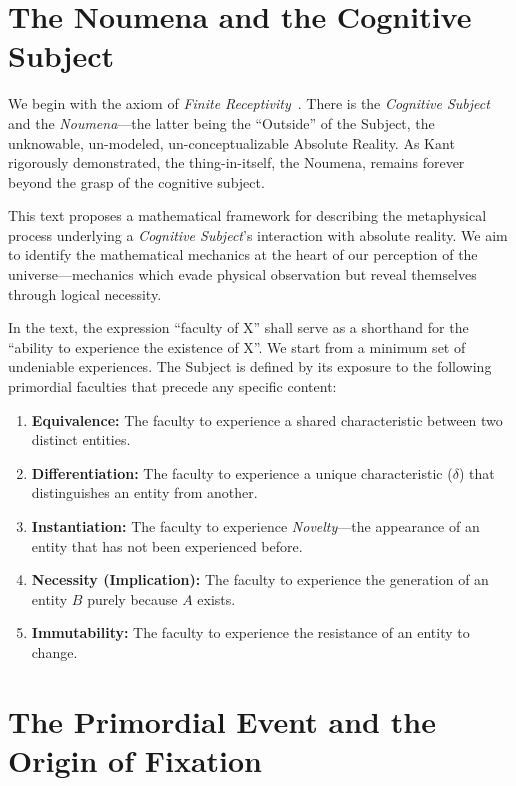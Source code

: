 \documentclass[11pt, a4paper]{article}
\theoremstyle{formalism}
\begin{document}
\section{The Noumena and the Cognitive Subject}

We begin with the axiom of \textit{Finite Receptivity}~\cite{Kant1781}. There
is the {\it Cognitive Subject\/} and the {\it Noumena\/}---the latter being the
``Outside'' of the Subject, the unknowable, un-modeled, un-conceptualizable
Absolute Reality. As Kant rigorously demonstrated, the thing-in-itself, the
Noumena, remains forever beyond the grasp of the cognitive subject.

This text proposes a mathematical framework for describing the metaphysical
process underlying a {\it Cognitive Subject\/}'s interaction with absolute
reality. We aim to identify the mathematical mechanics at the heart of our
perception of the universe---mechanics which evade physical observation but
reveal themselves through logical necessity.

In the text, the expression ``faculty of X'' shall serve as a shorthand for the
``ability to experience the existence of X''. We start from a minimum set of
undeniable experiences. The Subject is defined by its exposure to the following
primordial faculties that precede any specific content:

\begin{enumerate}
    \item \textbf{Equivalence:} The faculty to experience a shared 
    characteristic between two distinct entities. 

    \item \textbf{Differentiation:} The faculty to experience a unique 
    characteristic ($\delta$) that distinguishes an entity from another. 

    \item \textbf{Instantiation:} The faculty to experience \textit{Novelty}---the 
    appearance of an entity that has not been experienced before.

    \item \textbf{Necessity (Implication):} The faculty to experience the 
    generation of an entity $B$ purely because $A$ exists. 

    \item \textbf{Immutability:} The faculty to experience the 
    resistance of an entity to change. 
\end{enumerate}

\section{The Primordial Event and the Origin of Fixation}
\end{document}
